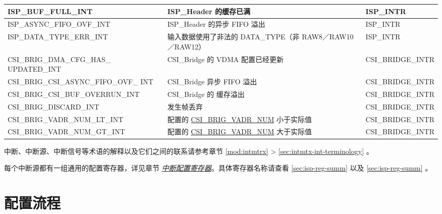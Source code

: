 \documentclass[main\_\_CN.tex]{subfiles}
\begin{document}
\begin{longtable}{ | L{5.6cm} | L{5.8cm} | L{3cm} | }
    ISP\_BUF\_FULL\_INT & ISP\_Header 的缓存已满 & ISP\_INTR \\ \hline
    ISP\_ASYNC\_FIFO\_OVF\_INT & ISP\_Header 的异步 FIFO 溢出 & ISP\_INTR \\ \hline
    ISP\_DATA\_TYPE\_ERR\_INT & 输入数据使用了非法的 DATA\_TYPE（非 RAW8／RAW10／RAW12） & ISP\_INTR \\ \hline
    CSI\_BRIG\_DMA\_CFG\_HAS\_          UPDATED\_INT & CSI\_Bridge 的 VDMA 配置已经更新  & CSI\_BRIDGE\_INTR \\\hline
    CSI\_BRIG\_CSI\_ASYNC\_FIFO\_OVF\_  INT & CSI\_Bridge 异步 FIFO 溢出 & CSI\_BRIDGE\_INTR \\\hline
    CSI\_BRIG\_CSI\_BUF\_OVERRUN\_INT & CSI\_Bridge 的 缓存溢出 & CSI\_BRIDGE\_INTR \\\hline
    CSI\_BRIG\_DISCARD\_INT & 发生帧丢弃 & CSI\_BRIDGE\_INTR \\\hline
    CSI\_BRIG\_VADR\_NUM\_LT\_INT & 配置的 \hyperref[fielddesc:CSIBRIGVADRNUM]{CSI\_BRIG\_VADR\_NUM} 小于实际值 & CSI\_BRIDGE\_INTR \\\hline
    CSI\_BRIG\_VADR\_NUM\_GT\_INT & 配置的 \hyperref[fielddesc:CSIBRIGVADRNUM]{CSI\_BRIG\_VADR\_NUM} 大于实际值 & CSI\_BRIDGE\_INTR \\\hline
\end{longtable}

\begin{tiplisting}
中断、中断源、中断信号等术语的解释以及它们之间的联系请参考章节 \ref{mod:intmtrx} \textit{} > \ref{sec:intmtx-int-terminology} \textit{}。
\end{tiplisting}


每个中断源都有一组通用的配置寄存器，详见章节 \hyperref[interrupt-config-registers]{\textit{中断配置寄存器}}。具体寄存器名称请查看 \ref{sec:isp-reg-summ} \textit{} 以及 \ref{sec:isp-reg-summ} \textit{}。



\section{配置流程}
\label{sec:isp-prog-procedures}
\end{document}
